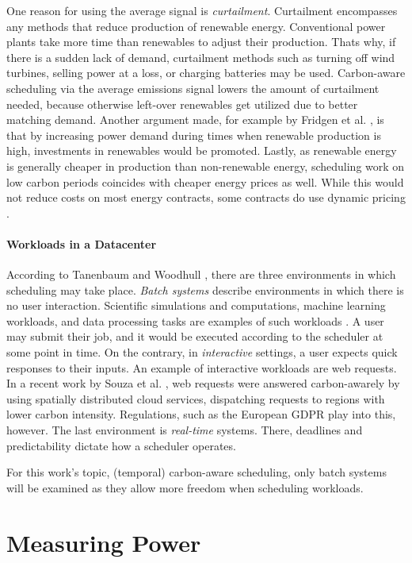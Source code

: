 One reason for using the average signal is \emph{curtailment}. 
Curtailment encompasses any methods that reduce production of renewable energy. 
Conventional power plants take more time than renewables to adjust their production.
Thats why, if there is a sudden lack of demand, curtailment methods such as turning off wind turbines, selling power at a loss, or charging batteries may be used. 
Carbon-aware scheduling via the average emissions signal lowers the amount of curtailment needed, because otherwise left-over renewables get utilized due to better matching demand.
Another argument made, for example by Fridgen et al. \cite{fridgen_not_2021}, is that by increasing power demand during times when renewable production is high, investments in renewables would be promoted. 
Lastly, as renewable energy is generally cheaper in production than non-renewable energy, scheduling work on low carbon periods coincides with cheaper energy prices as well. While this would not reduce costs on most energy contracts, some contracts do use dynamic pricing .

\paragraph{Workloads in a Datacenter} According to Tanenbaum and Woodhull \cite{tanenbaum_operating_2006}, there are three environments in which scheduling may take place. \emph{Batch systems} describe environments in which there is no user interaction. 
Scientific simulations and computations, machine learning workloads, and data processing tasks are examples of such workloads \cite{sukprasert_limitations_2024}. 
A user may submit their job, and it would be executed according to the scheduler at some point in time. 
On the contrary, in \emph{interactive} settings, a user expects quick responses to their inputs. 
An example of interactive workloads are web requests. In a recent work by Souza et al. \cite{souza_casper_2024}, web requests were answered carbon-awarely by using spatially distributed cloud services, dispatching requests to regions with lower carbon intensity. 
Regulations, such as the European GDPR  play into this, however.
The last environment is \emph{real-time} systems. There, deadlines and predictability dictate how a scheduler operates.

For this work's topic, (temporal) carbon-aware scheduling, only batch systems will be examined as they allow more freedom when scheduling workloads.

\section{Measuring Power}

